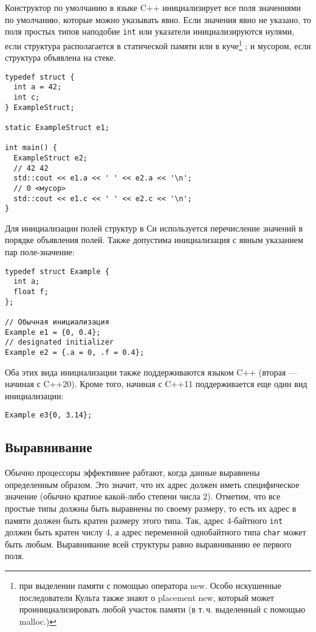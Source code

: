 \documentclass[14pt, a4paper]{extarticle}
\begin{document}
Конструктор по умолчанию в языке C++ инициализирует все поля значениями по
умолчанию, которые можно указывать явно. Если значения явно не указано, то
поля простых типов наподобие \verb|int| или указатели инициализируются нулями,
если структура располагается в статической памяти или в куче\footnote{при
выделении памяти с помощью оператора new. Особо искушенные последователи Культа
также знают о placement new, который может проинициализировать любой участок памяти (в
т.\,ч. выделенный с помощью malloc.)}
; и мусором, если
структура объявлена на стеке.
\begin{verbatim}
typedef struct {
  int a = 42;
  int c;
} ExampleStruct;

static ExampleStruct e1;

int main() {
  ExampleStruct e2;
  // 42 42
  std::cout << e1.a << ' ' << e2.a << '\n';
  // 0 <мусор>
  std::cout << e1.c << ' ' << e2.c << '\n';
}
\end{verbatim}

Для инициализации полей структур в Си используется перечисление значений
в порядке объявления полей. Также допустима инициализация с явным указанием
пар поле-значение:
\begin{verbatim}
typedef struct Example {
  int a;
  float f;
};

// Обычная инициализация
Example e1 = {0, 0.4};
// designated initializer
Example e2 = {.a = 0, .f = 0.4};
\end{verbatim}

Оба этих вида инициализации также поддерживаются языком C++ (вторая --- начиная с C++20).
Кроме того, начиная с C++11 поддерживается еще один вид инициализации:
\begin{verbatim}
Example e3{0, 3.14};
\end{verbatim}

\subsection*{Выравнивание}
Обычно процессоры эффективнее рабтают, когда данные выравнены определенным образом.
Это значит, что их адрес должен иметь специфическое значение (обычно кратное
какой-либо степени числа 2). Отметим, что все простые типы должны быть выравнены
по своему размеру, то есть их адрес в памяти должен быть кратен размеру этого типа.
Так, адрес 4-байтного \verb|int| должен быть кратен числу 4, а адрес переменной
однобайтного типа \verb|char| может быть любым.
Выравнивание всей структуры равно выравниванию ее первого поля.
\end{document}
